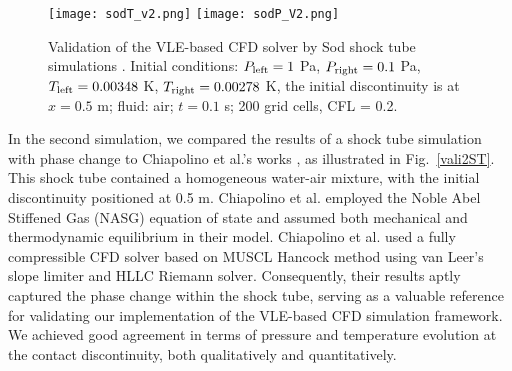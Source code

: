     \begin{figure}[htbp]

            \texttt{[image: sodT\_v2.png]}
            \texttt{[image: sodP\_V2.png]}

        \caption{Validation of the VLE-based CFD solver by Sod shock tube simulations \cite{sod1978survey}. Initial conditions: $P_{\rm{left}} = 1$ Pa, $P_{\rm{right}} = 0.1$ Pa, $T_{\rm{left}} = 0.00348$ K, $T_{\rm{right}} = 0.00278$ K, the initial discontinuity is at $x=0.5$ m; fluid: air; $t=0.1$ s; 200 grid cells, CFL = 0.2.}
        \label{vali1ST}
    \end{figure}
    
In the second simulation, we compared the results of a shock tube simulation with phase change to Chiapolino et al.'s works \cite{chiapolino2017simple}, as illustrated in Fig.~\ref{vali2ST}. This shock tube contained a homogeneous water-air mixture, with the initial discontinuity positioned at 0.5 m. Chiapolino et al. employed the Noble Abel Stiffened Gas (NASG) equation of state and assumed both mechanical and thermodynamic equilibrium in their model. Chiapolino et al. used a fully compressible CFD solver based on MUSCL Hancock method using van Leer’s slope limiter and HLLC Riemann solver. Consequently, their results aptly captured the phase change within the shock tube, serving as a valuable reference for validating our implementation of the VLE-based CFD simulation framework. We achieved good agreement in terms of pressure and temperature evolution at the contact discontinuity, both qualitatively and quantitatively.

